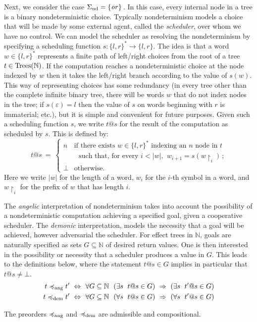 Next, we consider the case $\Sigma_{\text{nd}} = \{\operatorname{\mathit{or}}\}\,$. In this case,  every internal node in a tree is a binary nondeterministic choice.
Typically nondeterminism models a choice that will be made by some external agent, called the \emph{scheduler}, over whom we have no control. We can  model the scheduler as resolving the nondeterminism by specifying a scheduling 
function $s: \{l,r\}^* \to \{l,r\}$. The idea is that a word $w \in \{l,r\}^*$ represents a finite path of left/right choices from the root of a 
tree $t \in \textnormal{Trees}(\mathbb{N})$. If the computation reaches a nondeterministic choice at the node indexed by 
$w$ then it takes the left/right branch according to the value of $s(w)$. This way of representing choices has some redundancy
(in every tree other than the complete infinite binary tree, there will be words $w$ that do not index nodes in the tree; if $s(\varepsilon) = l$ then the value of $s$ on words beginning with $r$ is immaterial; etc.), but it is simple and convenient for future purposes. 
Given such a scheduling function $s$, we write $t@s$ for the result of the computation as scheduled by $s$. This is defined by:
\[
t@s ~ = ~ \begin{cases} 
 n & \text{if there exists $w \in \{l,r\}^*$ indexing an $n$ node in $t$} \\
    & ~~~\text{such that, for every $i < |w|$, $~w_{i+1} = s(w\!\restriction_i)\,$;} \\
  \bot & \text{otherwise.}
 \end{cases}
\]
Here we write $|w|$ for the length of a word, $w_i$ for the $i$-th symbol in a word, and $w \!\restriction_i$ for the prefix of $w$ that has length $i$.

The  \emph{angelic} interpretation of nondeterminism takes into account the possibility of a nondeterministic computation achieving a specified goal, given a cooperative scheduler.  The  \emph{demonic} interpretation, 
models the {necessity} that a goal will be achieved, however adversarial the scheduler. For effect trees in $\mathbb{N}$, goals are naturally specified as sets $G \subseteq \mathbb{N}$ of desired return values. One is then interested in the possibility or necessity 
that a scheduler produces a value in $G$. This leads to the definitions below, where the statement $t@s \in G$ implies in particular that $t@s \neq\bot$.
\begin{align*}
t \preccurlyeq_{\text{ang}} t' ~ \Leftrightarrow ~ ~& \forall G \subseteq \mathbb{N}~~ (\exists s ~\; t@s \in G)~ \Rightarrow~ (\exists s ~ \; t'@s \in G) 
\\
t \preccurlyeq_{\text{dem}} t' ~ \Leftrightarrow ~ ~& \forall G \subseteq \mathbb{N}~~ (\forall s ~ \; t@s \in G)~ \Rightarrow~ (\forall s ~ \; t'@s \in G) 
\end{align*}
\begin{aproposition}
The preorders $\preccurlyeq_{\text{ang}}$  and $\preccurlyeq_{\text{dem}}$ are admissible and compositional. 
\end{aproposition}



